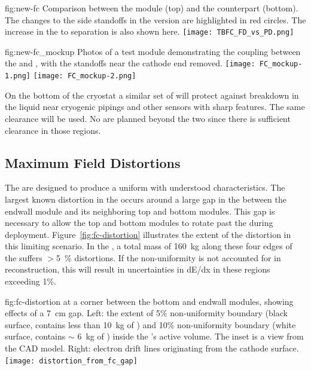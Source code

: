 \begin{dunefigure}
{fig:new-fc}
{Comparison between the   module (top) and the  counterpart (bottom).  The changes to the  side standoffs in the  version are highlighted in red circles.  The increase in the  to  separation is also shown here.} 
\texttt{[image: TBFC\_FD\_vs\_PD.png]}
\end{dunefigure}

\begin{dunefigure}
{fig:new-fc_mockup}
{Photos of a test module demonstrating the coupling between the   and , with the standoffs near the cathode end removed.} %
\texttt{[image: FC\_mockup-1.png]}
\texttt{[image: FC\_mockup-2.png]}
\end{dunefigure}

On the bottom of the cryostat a similar set of  %
will protect against %
breakdown in the liquid near cryogenic pipings and other sensors with sharp features. The same clearance will be used. No  are planned beyond the two  since there is sufficient clearance in those regions.  


\subsection{Maximum Field Distortions}
\label{sec:fdsp-hv-des-fc-mfd}

The  are designed to produce a uniform \efield with understood characteristics.
The largest known \efield distortion in the  occurs around a large gap in the  between the endwall module and its neighboring top and bottom modules. This gap is necessary to allow the top and bottom modules to rotate past the  during deployment.  Figure~\ref{fig:fc-distortion} illustrates the extent of the distortion in this limiting scenario. 
In the , a total \lar mass of \SI{160}{kg} along these four edges of the  suffers $>$\SI{5}{\%} \efield distortions.  If the non-uniformity is not accounted for in reconstruction, this will result in uncertainties in dE/dx in these regions exceeding 1\%. 

\begin{dunefigure}
{fig:fc-distortion}
{\efield at a corner between the bottom and endwall  modules, showing effects of a \SI{7}{cm} gap. Left: the extent of \num{5}\% \efield{} non-uniformity boundary (black surface, contains less than \SI{10}{kg} of \lar) and \num{10}\% non-uniformity boundary (white surface, contains $\sim$ \SI{6}{kg} of \lar) inside the 's active volume. The inset is a view from the CAD model.  Right: electron drift lines originating from the cathode surface.}
\texttt{[image: distortion\_from\_fc\_gap]}
\end{dunefigure}



